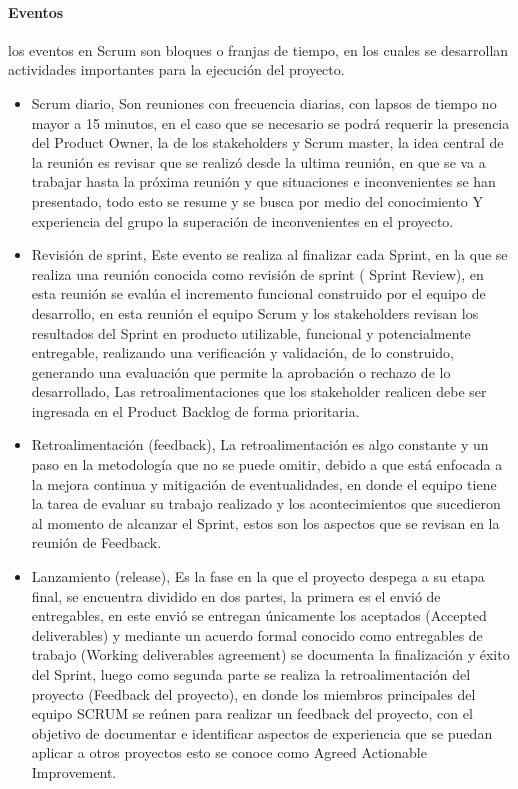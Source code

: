 \paragraph{Eventos}
los eventos en Scrum son bloques o franjas de tiempo, en los cuales se desarrollan actividades importantes para la ejecución del proyecto.
\begin{itemize}
    
    \item Scrum diario, Son reuniones con frecuencia diarias, con lapsos de tiempo no mayor a 15 minutos, en el caso que se necesario se podrá requerir la presencia del Product Owner, la de los stakeholders y Scrum master, la idea central de la reunión es revisar que se realizó desde la ultima reunión, en que se va a trabajar hasta la próxima reunión y que situaciones e inconvenientes se han presentado, todo esto se resume y se busca por medio del conocimiento Y experiencia del grupo la superación de inconvenientes en el proyecto. 
    \item Revisión de sprint, Este evento se realiza al finalizar cada Sprint, en la que se realiza una reunión conocida como revisión de sprint ( Sprint Review), en esta reunión se evalúa el incremento funcional construido por el equipo de desarrollo, en esta reunión el equipo Scrum y los stakeholders revisan los resultados del Sprint en producto utilizable, funcional y potencialmente entregable, realizando una verificación y validación, de lo construido, generando una evaluación que permite la aprobación o rechazo de lo desarrollado, Las retroalimentaciones que los stakeholder realicen debe ser ingresada  en el Product Backlog de forma prioritaria.  
    
     \item Retroalimentación (feedback), La retroalimentación es algo constante y un paso en la metodología que no se puede omitir, debido a que está enfocada a la mejora continua y mitigación de eventualidades, en donde el equipo tiene la tarea de evaluar su trabajo realizado y los acontecimientos que sucedieron al momento de alcanzar el Sprint, estos son los aspectos que se revisan en la reunión de Feedback.
     
     \item Lanzamiento (release), Es la fase en la que el proyecto despega a su etapa final, se encuentra dividido en dos partes, la primera es el envió de entregables, en este envió se entregan únicamente los aceptados (Accepted deliverables) y mediante un acuerdo formal conocido como entregables de trabajo (Working deliverables agreement) se documenta la finalización y éxito del Sprint, luego como segunda parte se realiza la retroalimentación del proyecto (Feedback del proyecto), en donde los miembros principales del equipo SCRUM se reúnen para realizar un feedback del proyecto, con el objetivo de documentar e identificar aspectos de experiencia que se puedan aplicar a otros proyectos esto se conoce como Agreed Actionable Improvement. 
     

\end{itemize}
